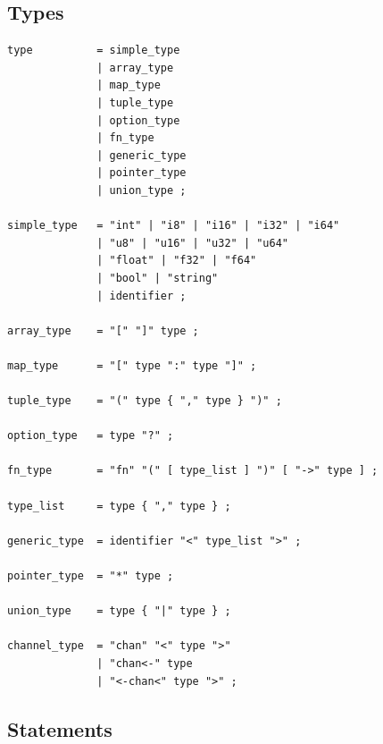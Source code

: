 \subsection{Types}

\begin{lstlisting}[language=EBNF]
type          = simple_type
              | array_type
              | map_type
              | tuple_type
              | option_type
              | fn_type
              | generic_type
              | pointer_type
              | union_type ;

simple_type   = "int" | "i8" | "i16" | "i32" | "i64"
              | "u8" | "u16" | "u32" | "u64"
              | "float" | "f32" | "f64"
              | "bool" | "string"
              | identifier ;

array_type    = "[" "]" type ;

map_type      = "[" type ":" type "]" ;

tuple_type    = "(" type { "," type } ")" ;

option_type   = type "?" ;

fn_type       = "fn" "(" [ type_list ] ")" [ "->" type ] ;

type_list     = type { "," type } ;

generic_type  = identifier "<" type_list ">" ;

pointer_type  = "*" type ;

union_type    = type { "|" type } ;

channel_type  = "chan" "<" type ">"
              | "chan<-" type
              | "<-chan<" type ">" ;
\end{lstlisting}

\subsection{Statements}

